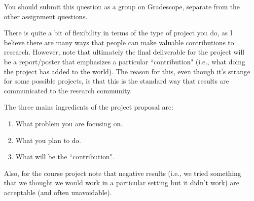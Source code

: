 \documentclass{article}
\def\blu#1{{\color{blu}#1}}
\begin{document}
\blu{You should submit this question as a group on Gradescope, separate from the other assignment questions.} 

There is quite a bit of flexibility in terms of the type of project you do, as I believe there are many ways that people can make valuable contributions to research. However, note that ultimately the final deliverable for the project will be a report/poster that emphasizes a particular ``contribution" (i.e., what doing the project has added to the world).
The reason for this, even though it's strange for some possible projects, is that this is the standard way that results are communicated to the research community.

\blu{The three mains ingredients of the project proposal are:
\begin{enumerate}
\item What problem you are focusing on.
\item What you plan to do.
\item What will be the ``contribution".
\end{enumerate}
}
Also, for the course project note that negative results (i.e., we tried something that we thought we would work in a particular setting but it didn't work) are acceptable (and often unavoidable).
\end{document}
